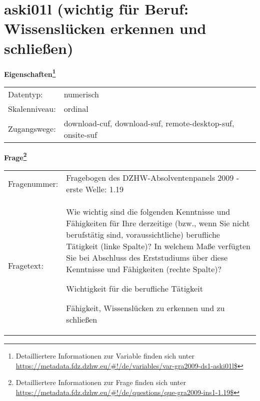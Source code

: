
    \setcounter{footnote}{0}

    \vspace*{-1.8cm}
	\section{aski01l (wichtig für Beruf: Wissenslücken erkennen und schließen)}
	\label{section:aski01l}



    \vspace*{0.5cm}
    \noindent\textbf{Eigenschaften\footnote{Detailliertere Informationen zur Variable finden sich unter
		\url{https://metadata.fdz.dzhw.eu/\#!/de/variables/var-gra2009-ds1-aski01l$}}}\\
	\begin{tabularx}{\hsize}{@{}lX}
	Datentyp: & numerisch \\
	Skalenniveau: & ordinal \\
	Zugangswege: &
	  download-cuf, 
	  download-suf, 
	  remote-desktop-suf, 
	  onsite-suf
 \\
    \end{tabularx}



				\vspace*{0.5cm}
                \noindent\textbf{Frage\footnote{Detailliertere Informationen zur Frage finden sich unter
		              \url{https://metadata.fdz.dzhw.eu/\#!/de/questions/que-gra2009-ins1-1.19$}}}\\
				\begin{tabularx}{\hsize}{@{}lX}
					Fragenummer: &
					  Fragebogen des DZHW-Absolventenpanels 2009 - erste Welle:
					  1.19
 \\
					Fragetext: & Wie wichtig sind die folgenden Kenntnisse und Fähigkeiten für Ihre derzeitige (bzw., wenn Sie nicht berufstätig sind, voraussichtliche) berufliche Tätigkeit (linke Spalte)? In welchem Maße verfügten Sie bei Abschluss des Erststudiums über diese Kenntnisse und Fähigkeiten (rechte Spalte)?\par  Wichtigkeit für die berufliche Tätigkeit\par  Fähigkeit, Wissenslücken zu erkennen und zu schließen \\
				\end{tabularx}





